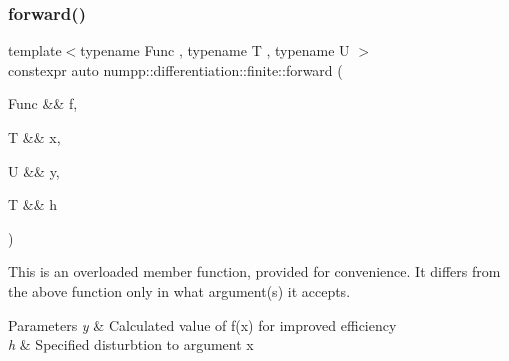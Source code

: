 \subsubsection{\texorpdfstring{forward()}{forward()}\hspace{0.1cm}{\footnotesize\ttfamily [3/3]}}
{\footnotesize\ttfamily template$<$typename Func , typename T , typename U $>$ \\
constexpr auto numpp\+::differentiation\+::finite\+::forward (\begin{DoxyParamCaption}\item[{Func \&\&}]{f,  }\item[{T \&\&}]{x,  }\item[{U \&\&}]{y,  }\item[{T \&\&}]{h }\end{DoxyParamCaption})}

This is an overloaded member function, provided for convenience. It differs from the above function only in what argument(s) it accepts.


\begin{DoxyParams}{Parameters}
{\em y} & Calculated value of f(x) for improved efficiency \\
\hline
{\em h} & Specified disturbtion to argument x\\
\hline
\end{DoxyParams}
